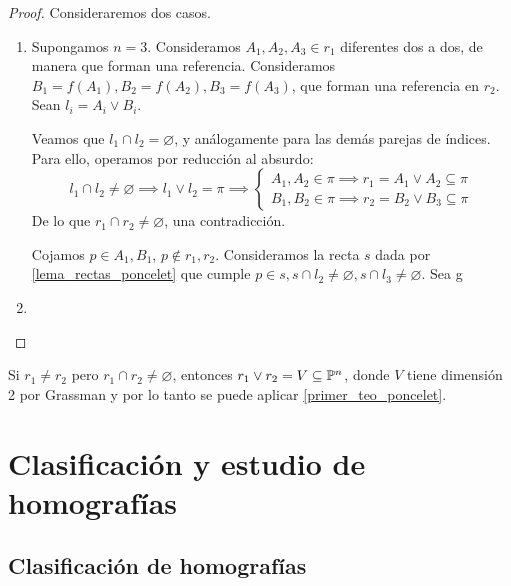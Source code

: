 \begin{proof} %
    Consideraremos dos casos.
    \begin{enumerate}
        \item Supongamos $n = 3$. Consideramos $A_1, A_2, A_3 \in
        r_1$ diferentes dos a dos, de manera que forman una
        referencia. Consideramos $B_1 = f(A_1), B_2 = f(A_2),
        B_3 = f(A_3)$, que forman una referencia en $r_2$.
        Sean $l_i = A_i \vee B_i$.
        
        Veamos que $l_1 \cap l_2 = \varnothing$, y análogamente
        para las demás parejas de índices. Para ello, operamos
        por reducción al absurdo:
        \[
        l_1 \cap l_2 \neq \varnothing \implies l_1 \vee l_2 = \pi
        \implies
        \begin{cases}
        A_1, A_2 \in \pi \implies r_1 = A_1 \vee A_2 \subseteq \pi\\
        B_1, B_2 \in \pi \implies r_2 = B_2 \vee B_3 \subseteq \pi
        \end{cases}
        \]
        De lo que $r_1 \cap r_2 \neq \varnothing$,
        una contradicción.
        
        Cojamos $p \in A_1, B_1$, $p \not \in r_1, r_2$. Consideramos
        la recta $s$ dada por \ref{lema_rectas_poncelet} que cumple
        $p \in s, s \cap l_2 \neq \varnothing, s \cap l_3 \neq 
        \varnothing$.
        Sea g
        \item
    \end{enumerate}
\end{proof}

\begin{obs}
    Si $r_1 \neq r_2$ pero $r_1 \cap r_2 \neq \varnothing$, entonces
    $r_1 \vee r_2 = V \subseteq \mathbb{P}^n$, donde $V$ tiene dimensión
    2 por Grassman y por lo tanto se puede 
    aplicar \ref{primer_teo_poncelet}.
\end{obs}

\section{Clasificación y estudio de homografías}

\subsection{Clasificación de homografías}

